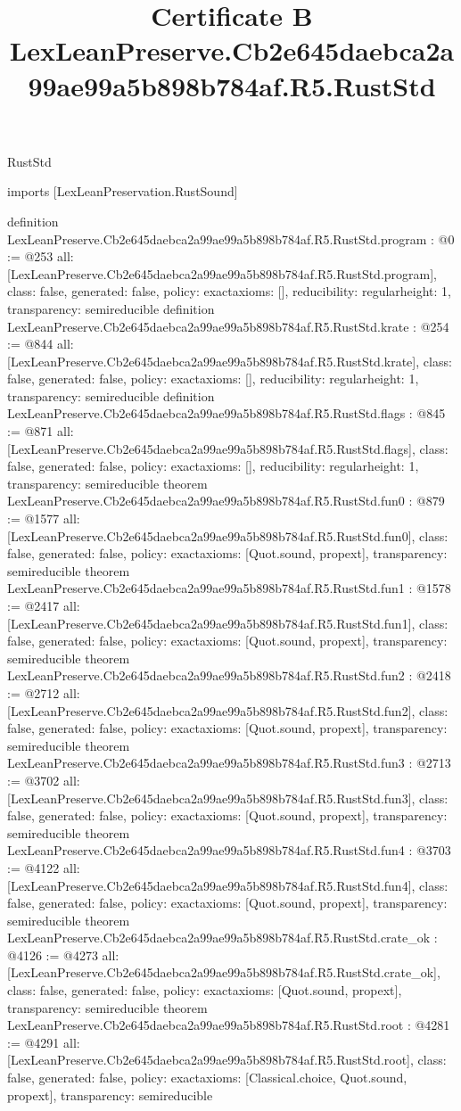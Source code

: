 \begin{lexlean}{RustStd}
\title{Certificate B LexLeanPreserve.Cb2e645daebca2a99ae99a5b898b784af.R5.RustStd}
\begin{coremodule}
imports [LexLeanPreservation.RustSound]

definition LexLeanPreserve.Cb2e645daebca2a99ae99a5b898b784af.R5.RustStd.program : @0 := @253 {
  all: [LexLeanPreserve.Cb2e645daebca2a99ae99a5b898b784af.R5.RustStd.program],
  class: false,
  generated: false,
  policy: exact{axioms: []},
  reducibility: regular{height: 1},
  transparency: semireducible
}
definition LexLeanPreserve.Cb2e645daebca2a99ae99a5b898b784af.R5.RustStd.krate : @254 := @844 {
  all: [LexLeanPreserve.Cb2e645daebca2a99ae99a5b898b784af.R5.RustStd.krate],
  class: false,
  generated: false,
  policy: exact{axioms: []},
  reducibility: regular{height: 1},
  transparency: semireducible
}
definition LexLeanPreserve.Cb2e645daebca2a99ae99a5b898b784af.R5.RustStd.flags : @845 := @871 {
  all: [LexLeanPreserve.Cb2e645daebca2a99ae99a5b898b784af.R5.RustStd.flags],
  class: false,
  generated: false,
  policy: exact{axioms: []},
  reducibility: regular{height: 1},
  transparency: semireducible
}
theorem LexLeanPreserve.Cb2e645daebca2a99ae99a5b898b784af.R5.RustStd.fun0 : @879 := @1577 {
  all: [LexLeanPreserve.Cb2e645daebca2a99ae99a5b898b784af.R5.RustStd.fun0],
  class: false,
  generated: false,
  policy: exact{axioms: [Quot.sound, propext]},
  transparency: semireducible
}
theorem LexLeanPreserve.Cb2e645daebca2a99ae99a5b898b784af.R5.RustStd.fun1 : @1578 := @2417 {
  all: [LexLeanPreserve.Cb2e645daebca2a99ae99a5b898b784af.R5.RustStd.fun1],
  class: false,
  generated: false,
  policy: exact{axioms: [Quot.sound, propext]},
  transparency: semireducible
}
theorem LexLeanPreserve.Cb2e645daebca2a99ae99a5b898b784af.R5.RustStd.fun2 : @2418 := @2712 {
  all: [LexLeanPreserve.Cb2e645daebca2a99ae99a5b898b784af.R5.RustStd.fun2],
  class: false,
  generated: false,
  policy: exact{axioms: [Quot.sound, propext]},
  transparency: semireducible
}
theorem LexLeanPreserve.Cb2e645daebca2a99ae99a5b898b784af.R5.RustStd.fun3 : @2713 := @3702 {
  all: [LexLeanPreserve.Cb2e645daebca2a99ae99a5b898b784af.R5.RustStd.fun3],
  class: false,
  generated: false,
  policy: exact{axioms: [Quot.sound, propext]},
  transparency: semireducible
}
theorem LexLeanPreserve.Cb2e645daebca2a99ae99a5b898b784af.R5.RustStd.fun4 : @3703 := @4122 {
  all: [LexLeanPreserve.Cb2e645daebca2a99ae99a5b898b784af.R5.RustStd.fun4],
  class: false,
  generated: false,
  policy: exact{axioms: [Quot.sound, propext]},
  transparency: semireducible
}
theorem LexLeanPreserve.Cb2e645daebca2a99ae99a5b898b784af.R5.RustStd.crate_ok : @4126 := @4273 {
  all: [LexLeanPreserve.Cb2e645daebca2a99ae99a5b898b784af.R5.RustStd.crate_ok],
  class: false,
  generated: false,
  policy: exact{axioms: [Quot.sound, propext]},
  transparency: semireducible
}
theorem LexLeanPreserve.Cb2e645daebca2a99ae99a5b898b784af.R5.RustStd.root : @4281 := @4291 {
  all: [LexLeanPreserve.Cb2e645daebca2a99ae99a5b898b784af.R5.RustStd.root],
  class: false,
  generated: false,
  policy: exact{axioms: [Classical.choice, Quot.sound, propext]},
  transparency: semireducible
}


\end{coremodule}
\end{lexlean}
